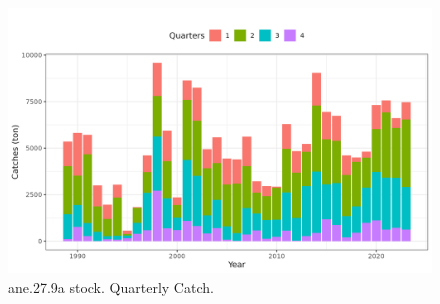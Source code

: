 \documentclass[
]{article}
\begin{document}
\begin{figure}[H]

{\centering \includegraphics[width=0.95\linewidth]{report/run/S1.0_4FLEETS/fig_catches} 

}

\caption{ane.27.9a stock. Quarterly Catch.}\label{fig:unnamed-chunk-3}
\end{figure}
\end{document}
